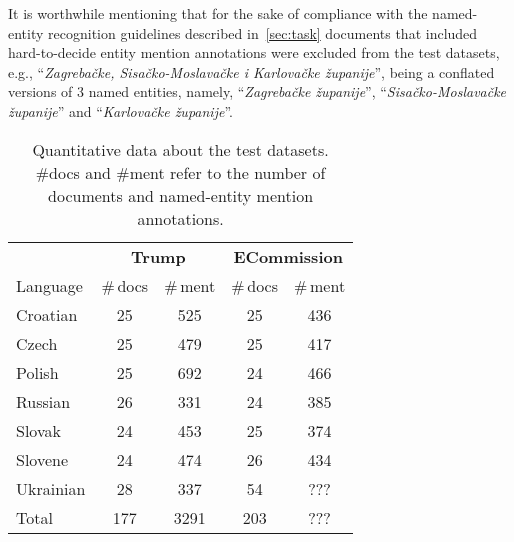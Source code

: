 \documentclass[11pt]{article}
\begin{document}
It is worthwhile mentioning that for the sake of compliance with the named-entity recognition guidelines described
in~\ref{sec:task} documents that included hard-to-decide entity mention annotations were excluded from the test 
datasets, e.g., ``\textit{Zagrebačke, Sisačko-Moslavačke i Karlovačke županije}'', being a conflated versions of 3 
named entities, namely, ``\textit{Zagrebačke županije}'', ``\textit{Sisačko-Moslavačke županije}'' and ``\textit{Karlovačke županije}''.

\begin{table}
\begin{center}
\begin{footnotesize}
\begin{tabular}{lcccc}
\toprule 
 & \multicolumn{2}{c}{\textbf{{\sc Trump}}} & \multicolumn{2}{c}{\textbf{{\sc ECommission}}} \\
\cmidrule(lr){2-3}
\cmidrule(lr){4-5}
Language &  \#\,docs & \#\,ment & \#\,docs & \#\,ment \\
\midrule
Croatian & 25 & 525 & 25 & 436 \\
Czech & 25 & 479  & 25 & 417 \\
Polish & 25 & 692  & 24 & 466 \\
Russian & 26 & 331  & 24 & 385 \\
Slovak  & 24 & 453  & 25 & 374 \\
Slovene & 24 & 474  & 26 & 434 \\
Ukrainian & 28 & 337  & 54 & ??? \\
\midrule
Total & 177 & 3291  & 203 & ???  \\


\bottomrule
\end{tabular}
\end{footnotesize}
\end{center}
\caption{Quantitative data about the test datasets. \#docs and \#ment refer to the number of documents and named-entity mention annotations.}
\label{tab:datasets}
\end{table}

\end{document}
